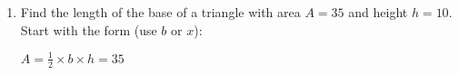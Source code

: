 \documentclass[12pt, twoside]{article}
\begin{document}
\begin{enumerate}
\item Find the length of the base of a triangle with area $A=35$ and height $h=10$. Start with the form (use $b$ or $x$): \par \medskip
  $A = \frac{1}{2} \times b \times h = 35$
  \begin{flushright}
  \end{flushright}


\end{enumerate}
\end{document}
